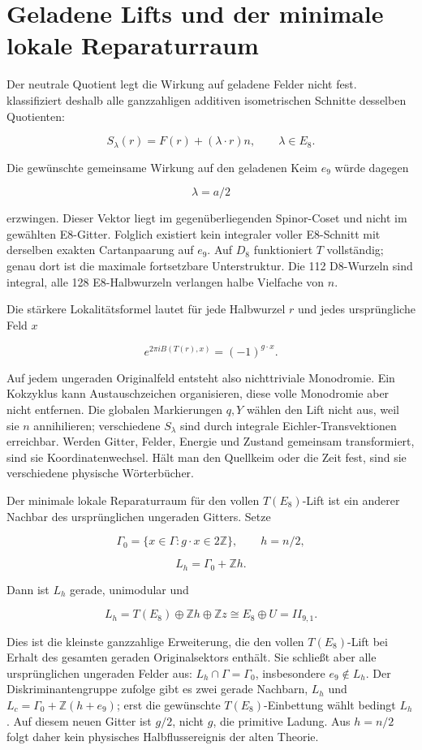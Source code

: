 \section{Geladene Lifts und der minimale lokale Reparaturraum}

Der neutrale Quotient legt die Wirkung auf geladene Felder nicht fest.  klassifiziert deshalb alle ganzzahligen additiven isometrischen Schnitte desselben Quotienten:

\[
S_\lambda(r)=F(r)+(\lambda\cdot r)n,\qquad \lambda\in E_8.
\]

Die gewünschte gemeinsame Wirkung auf den geladenen Keim \(e_9\) würde dagegen

\[
\lambda=a/2
\]

erzwingen. Dieser Vektor liegt im gegenüberliegenden Spinor-Coset und nicht im gewählten E8-Gitter. Folglich existiert kein integraler voller E8-Schnitt mit derselben exakten Cartanpaarung auf \(e_9\). Auf \(D_8\) funktioniert \(T\) vollständig; genau dort ist die maximale fortsetzbare Unterstruktur. Die 112 D8-Wurzeln sind integral, alle 128 E8-Halbwurzeln verlangen halbe Vielfache von \(n\).

Die stärkere Lokalitätsformel lautet für jede Halbwurzel \(r\) und jedes ursprüngliche Feld \(x\)

\[
e^{2\pi iB(T(r),x)}=(-1)^{g\cdot x}.
\]

Auf jedem ungeraden Originalfeld entsteht also nichttriviale Monodromie. Ein Kokzyklus kann Austauschzeichen organisieren, diese volle Monodromie aber nicht entfernen. Die globalen Markierungen \(q,Y\) wählen den Lift nicht aus, weil sie \(n\) annihilieren; verschiedene \(S_\lambda\) sind durch integrale Eichler-Transvektionen erreichbar. Werden Gitter, Felder, Energie und Zustand gemeinsam transformiert, sind sie Koordinatenwechsel. Hält man den Quellkeim oder die Zeit fest, sind sie verschiedene physische Wörterbücher.

Der minimale lokale Reparaturraum für den vollen \(T(E_8)\)-Lift ist ein anderer Nachbar des ursprünglichen ungeraden Gitters. Setze

\[
\Gamma_0=\{x\in\Gamma:g\cdot x\in2\mathbb Z\},\qquad h=n/2,
\]

\[
L_h=\Gamma_0+\mathbb Zh.
\]

Dann ist \(L_h\) gerade, unimodular und

\[
L_h=T(E_8)\oplus\mathbb Zh\oplus\mathbb Zz
\cong E_8\oplus U=II_{9,1}.
\]

Dies ist die kleinste ganzzahlige Erweiterung, die den vollen \(T(E_8)\)-Lift bei Erhalt des gesamten geraden Originalsektors enthält. Sie schließt aber alle ursprünglichen ungeraden Felder aus: \(L_h\cap\Gamma=\Gamma_0\), insbesondere \(e_9\notin L_h\). Der Diskriminantengruppe zufolge gibt es zwei gerade Nachbarn, \(L_h\) und \(L_c=\Gamma_0+\mathbb Z(h+e_9)\); erst die gewünschte \(T(E_8)\)-Einbettung wählt bedingt \(L_h\). Auf diesem neuen Gitter ist \(g/2\), nicht \(g\), die primitive Ladung. Aus \(h=n/2\) folgt daher kein physisches Halbflussereignis der alten Theorie.


